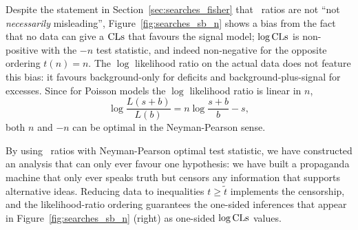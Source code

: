Despite the statement in Section~\ref{sec:searches_fisher} that \pvalue\
ratios are not ``not \emph{necessarily} misleading'',
Figure~\ref{fig:searches_sb_n} shows a bias from the fact that
no data can give a $\mathrm{CLs}$ that favours the signal model;
$\log\mathrm{CLs}$ is non-positive with the $-n$ test statistic, and indeed non-negative
for the opposite ordering $t(n) = n$.
The $\log$ likelihood ratio on the actual data does not feature this bias:
it favours background-only for deficits and background-plus-signal for
excesses.
Since for Poisson models the $\log$ likelihood ratio is linear in $n$,
\begin{equation}
\log \frac{L(s + b)}{L(b)}
= n\log\frac{s + b}{b} - s
,
\end{equation}
both $n$ and $-n$ can be optimal in the Neyman-Pearson sense.

By using \pvalue\ ratios with Neyman-Pearson optimal test statistic, we have
constructed an analysis that can only ever favour one hypothesis:
we have built a propaganda machine that only ever speaks truth but censors any
information that supports alternative ideas.
Reducing data to inequalities $t \geq \tilde{t}$ implements the censorship,
and the likelihood-ratio ordering guarantees the one-sided inferences
that appear in Figure~\ref{fig:searches_sb_n} (right) as one-sided
$\log\mathrm{CLs}$ values.

